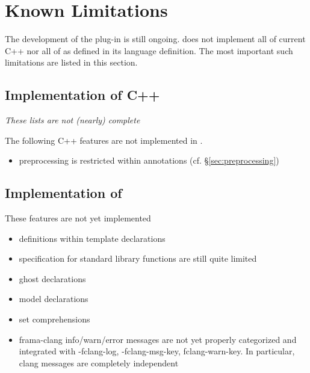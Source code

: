 \chapter{Known Limitations}

The development of the \fclang plug-in is still ongoing.
\fclang does not implement all of current C++ nor all of 
\acslpp as defined in its language definition\cite{acslpp}.
The most important such limitations are listed in this section.

\section{Implementation of C++}

\textit{These lists are not (nearly) complete}

The following C++ features are not implemented in \acslpp.
\begin{itemize}
\item preprocessing is restricted within \acslpp annotations (cf. \S\ref{sec:preprocessing})
\end{itemize}

\section{Implementation of \acslpp}

These \acslpp features are not yet implemented
\begin{itemize}

\item \acslpp definitions within template declarations
\item \acslpp specification for standard \cpp library functions are still quite limited
\item ghost declarations
\item model declarations
\item set comprehensions
\item frama-clang info/warn/error messages are not yet properly categorized and integrated with -fclang-log, -fclang-msg-key, fclang-warn-key. In particular, clang messages are completely independent

\end{itemize}
